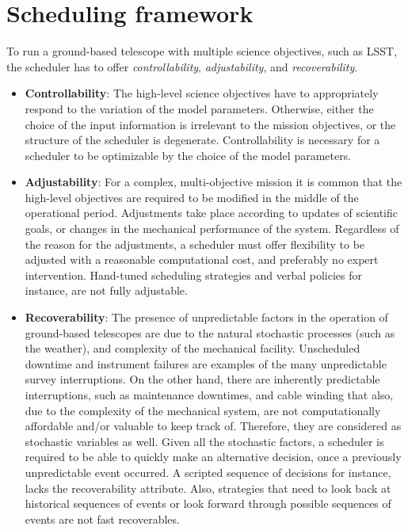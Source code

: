 \documentclass[12pt]{aastex62}
\theoremstyle{definition}
\begin{document}
\section{Scheduling framework}\label{sec_SM}
To run a ground-based telescope with multiple science objectives, such as LSST, the scheduler has to offer \textit{controllability}, \textit{adjustability}, and \textit{recoverability}.
\begin{itemize}
\item \textbf{Controllability}: The high-level science objectives have to appropriately respond to the variation of the model parameters. Otherwise, either the choice of the input information is irrelevant to the mission objectives, or the structure of the scheduler is degenerate. Controllability is necessary for a scheduler to be optimizable by the choice of the model parameters. 
\item \textbf{Adjustability}: For a complex, multi-objective mission it is common that the high-level objectives are required to be modified in the middle of the operational period. Adjustments take place according to updates of scientific goals, or changes in the mechanical performance of the system. Regardless of the reason for the adjustments, a scheduler must offer flexibility to be adjusted with a reasonable computational cost, and preferably no expert intervention. Hand-tuned scheduling strategies and verbal policies for instance, are not fully adjustable.

\item \textbf{Recoverability}: The presence of unpredictable factors in the operation of ground-based telescopes are due to the natural stochastic processes (such as the weather), and complexity of the mechanical facility. Unscheduled downtime and instrument failures are examples of the many unpredictable survey interruptions. On the other hand, there are inherently predictable interruptions, such as maintenance downtimes, and cable winding that also, due to the complexity of the mechanical system, are not computationally affordable and/or valuable to keep track of. Therefore, they are considered as stochastic variables as well. Given all the stochastic factors, a scheduler is required to be able to quickly make an alternative decision, once a previously unpredictable event occurred. A scripted sequence of decisions for instance, lacks the recoverability attribute. Also, strategies that need to look back at historical sequences of events or look forward through possible sequences of events are not fast recoverables. 
\end{itemize}
\end{document}
